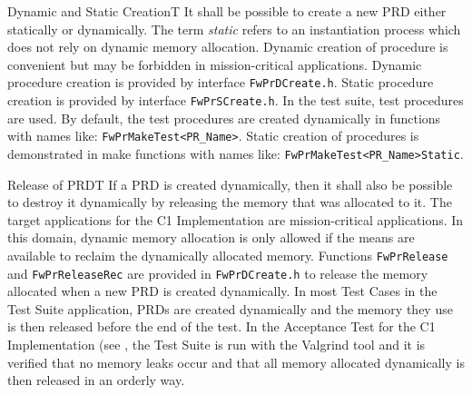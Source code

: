 \documentclass[requirements]{../fwprofile}
\begin{document}
\begin{fw_req_note}{Dynamic and Static Creation}{T}
{ It shall be possible to create a new PRD either statically or 
dynamically.}
{The term \emph{static} refers to an instantiation process which does not rely on 
dynamic memory allocation.}
{Dynamic creation of procedure is convenient but may be forbidden in 
mission-critical applications.}
{Dynamic procedure creation is provided by interface 
\texttt{FwPrDCreate.h}. 
Static procedure creation is provided by interface \texttt{FwPrSCreate.h}.} 
{In the test suite, test procedures are used. By default, the test 
procedures are created dynamically in functions with names like: \texttt{FwPrMakeTest<PR\_Name>}. 
Static creation of procedures is demonstrated in make functions with names like: 
\texttt{FwPrMakeTest<PR\_Name>Static}.}
\end{fw_req_note}


\begin{fw_req}{Release of PRD}{T}
{If a PRD is created dynamically, then it shall also be possible to destroy 
it dynamically by releasing the memory that was allocated to it.}
{The target applications for the C1 Implementation are mission-critical 
applications. 
In this domain, dynamic memory allocation is only allowed if the means are available to reclaim 
the dynamically allocated memory.}
{Functions \texttt{FwPrRelease} and \texttt{FwPrReleaseRec} are provided 
in \texttt{FwPrDCreate.h} to release the memory allocated when a new PRD is created 
dynamically.} 
{In most Test Cases in the  Test Suite application, PRDs are created 
dynamically and the memory they use is then released before the end of the test. 
In the Acceptance Test for the C1 Implementation (see \cite{ref:um}, the Test Suite is run 
with the Valgrind tool and it is verified that no memory leaks occur and 
that all memory allocated dynamically is then released in an orderly way.}
\end{fw_req}
\end{document}
